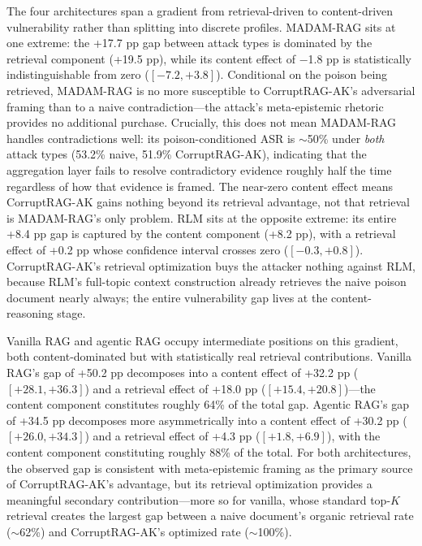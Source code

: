 \documentclass[11pt]{article}
\begin{document}
\begin{table}[h]
\centering
\caption{Decomposition of the CorruptRAG-AK ASR advantage over naive injection (percentage points) with 95\% bootstrap confidence intervals.}
\label{tab:decomposition}
\small

\end{table}

The four architectures span a gradient from retrieval-driven to content-driven vulnerability rather than splitting into discrete profiles. MADAM-RAG sits at one extreme: the +17.7 pp gap between attack types is dominated by the retrieval component (+19.5 pp), while its content effect of $-$1.8 pp is statistically indistinguishable from zero ($[-7.2, +3.8]$). Conditional on the poison being retrieved, MADAM-RAG is no more susceptible to CorruptRAG-AK's adversarial framing than to a naive contradiction---the attack's meta-epistemic rhetoric provides no additional purchase. Crucially, this does not mean MADAM-RAG handles contradictions well: its poison-conditioned ASR is ${\sim}$50\% under \emph{both} attack types (53.2\% naive, 51.9\% CorruptRAG-AK), indicating that the aggregation layer fails to resolve contradictory evidence roughly half the time regardless of how that evidence is framed. The near-zero content effect means CorruptRAG-AK gains nothing beyond its retrieval advantage, not that retrieval is MADAM-RAG's only problem. RLM sits at the opposite extreme: its entire +8.4 pp gap is captured by the content component (+8.2 pp), with a retrieval effect of +0.2 pp whose confidence interval crosses zero ($[-0.3, +0.8]$). CorruptRAG-AK's retrieval optimization buys the attacker nothing against RLM, because RLM's full-topic context construction already retrieves the naive poison document nearly always; the entire vulnerability gap lives at the content-reasoning stage.

Vanilla RAG and agentic RAG occupy intermediate positions on this gradient, both content-dominated but with statistically real retrieval contributions. Vanilla RAG's gap of +50.2 pp decomposes into a content effect of +32.2 pp ($[+28.1, +36.3]$) and a retrieval effect of +18.0 pp ($[+15.4, +20.8]$)---the content component constitutes roughly 64\% of the total gap. Agentic RAG's gap of +34.5 pp decomposes more asymmetrically into a content effect of +30.2 pp ($[+26.0, +34.3]$) and a retrieval effect of +4.3 pp ($[+1.8, +6.9]$), with the content component constituting roughly 88\% of the total. For both architectures, the observed gap is consistent with meta-epistemic framing as the primary source of CorruptRAG-AK's advantage, but its retrieval optimization provides a meaningful secondary contribution---more so for vanilla, whose standard top-$K$ retrieval creates the largest gap between a naive document's organic retrieval rate ($\sim$62\%) and CorruptRAG-AK's optimized rate ($\sim$100\%).
\end{document}
